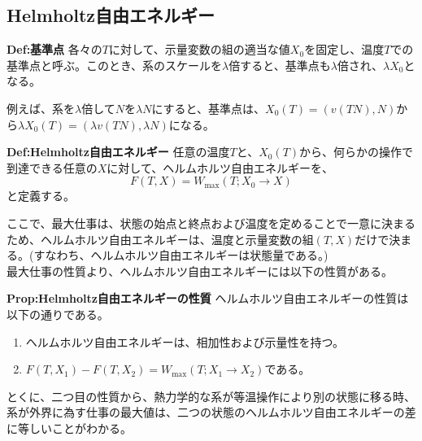 \documentclass[a4paper,11pt]{jsarticle}
\begin{document}
\subsection{Helmholtz自由エネルギー}
\begin{itembox}[l]{\textbf{Def:基準点}}
    各々の$T$に対して、示量変数の組の適当な値$X_0$を固定し、温度$T$での基準点と呼ぶ。このとき、系のスケールを$\lambda$倍すると、基準点も$\lambda$倍され、$\lambda X_0$となる。
\end{itembox}
例えば、系を$\lambda$倍して$N$を$\lambda N$にすると、基準点は、$X_0(T) =(v(TN),N)$から$\lambda X_0(T) = (\lambda v(TN),\lambda N)$になる。\\

\begin{itembox}[l]{\textbf{Def:Helmholtz自由エネルギー}}
    任意の温度$T$と、$X_0(T)$から、何らかの操作で到達できる任意の$X$に対して、ヘルムホルツ自由エネルギーを、
    \begin{equation}
        F(T,X) = W_{\text{max}}(T;X_0\rightarrow X)
    \end{equation}
    と定義する。

\end{itembox}
ここで、最大仕事は、状態の始点と終点および温度を定めることで一意に決まるため、ヘルムホルツ自由エネルギーは、温度と示量変数の組$(T,X)$だけで決まる。(すなわち、ヘルムホルツ自由エネルギーは状態量である。)\\

最大仕事の性質より、ヘルムホルツ自由エネルギーには以下の性質がある。\\
\begin{itembox}[l]{\textbf{Prop:Helmholtz自由エネルギーの性質}}
    ヘルムホルツ自由エネルギーの性質は以下の通りである。
    \begin{enumerate}
        \item ヘルムホルツ自由エネルギーは、相加性および示量性を持つ。
        \item $F(T,X_1)-F(T,X_2)=W_{\text{max}}(T;X_1\rightarrow X_2)$である。
    \end{enumerate}
\end{itembox}
とくに、二つ目の性質から、熱力学的な系が等温操作により別の状態に移る時、系が外界に為す仕事の最大値は、二つの状態のヘルムホルツ自由エネルギーの差に等しいことがわかる。\\
\end{document}
